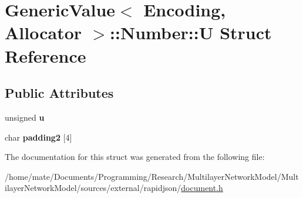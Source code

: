 \hypertarget{structGenericValue_1_1Number_1_1U}{}\section{Generic\+Value$<$ Encoding, Allocator $>$\+:\+:Number\+:\+:U Struct Reference}
\label{structGenericValue_1_1Number_1_1U}
\subsection*{Public Attributes}
\begin{DoxyCompactItemize}
\item 
unsigned {\bfseries u}\hypertarget{structGenericValue_1_1Number_1_1U_a175e3a2bd43e6880791eb7c950d2f147}{}\label{structGenericValue_1_1Number_1_1U_a175e3a2bd43e6880791eb7c950d2f147}

\item 
char {\bfseries padding2} \mbox{[}4\mbox{]}\hypertarget{structGenericValue_1_1Number_1_1U_a9341f65c1645f24fd001a1ebf58d3c5b}{}\label{structGenericValue_1_1Number_1_1U_a9341f65c1645f24fd001a1ebf58d3c5b}

\end{DoxyCompactItemize}


The documentation for this struct was generated from the following file\+:\begin{DoxyCompactItemize}
\item 
/home/mate/\+Documents/\+Programming/\+Research/\+Multilayer\+Network\+Model/\+Multilayer\+Network\+Model/sources/external/rapidjson/\hyperlink{document_8h}{document.\+h}\end{DoxyCompactItemize}
